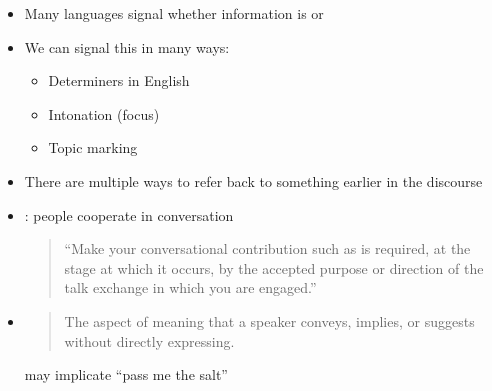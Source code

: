 \documentclass[headrule,footrule]{foils}
\begin{document}

\begin{itemize}
\item Many languages signal whether information is  or 

\item We can signal this in many ways:
  \begin{itemize}
  \item Determiners in English
  \item Intonation (focus)
  \item Topic marking
  \end{itemize}

\item There are multiple ways to refer back to something
  earlier in the discourse
  \begin{exe}
    \ex {} \hfill {}
    \ex {} \hfill {}
    \ex {} \hfill {}
    \ex {} \hfill {}
    \ex {} \hfill {}

\end{exe}

\end{itemize}

\begin{itemize}
\item {}: people cooperate in conversation
  \begin{quote}
    ``Make your conversational contribution such as is required, at the stage at which it occurs, by the accepted purpose or direction of the talk exchange in which you are engaged.''
  \end{quote}
\item {}
  \begin{quote}
    The aspect of meaning that a speaker conveys, implies, or suggests
    without directly expressing.
  \end{quote}
  may implicate ``pass me the salt''
\end{itemize}
\end{document}
